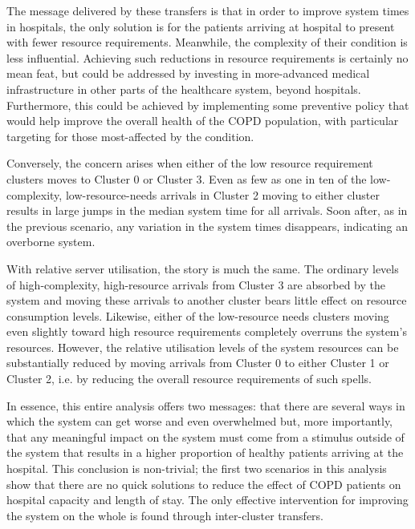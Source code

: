\begin{table}
    \centering%
    \resizebox{\textwidth}{!}{%
        
    }
    \caption{%
        Proportional changes in median relative utilisation for selected cluster
        transfers
    }\label{tab:moving_util}
\end{table}

The message delivered by these transfers is that in order to improve system
times in hospitals, the only solution is for the patients arriving at hospital
to present with fewer resource requirements. Meanwhile, the complexity of their
condition is less influential. Achieving such reductions in resource
requirements is certainly no mean feat, but could be addressed by investing in
more-advanced medical infrastructure in other parts of the healthcare system,
beyond hospitals. Furthermore, this could be achieved by implementing some
preventive policy that would help improve the overall health of the COPD
population, with particular targeting for those most-affected by the condition.

Conversely, the concern arises when either of the low resource requirement
clusters moves to Cluster 0 or Cluster 3. Even as few as one in ten of the
low-complexity, low-resource-needs arrivals in Cluster 2 moving to either
cluster results in large jumps in the median system time for all arrivals. Soon
after, as in the previous scenario, any variation in the system times
disappears, indicating an overborne system.

With relative server utilisation, the story is much the same. The ordinary
levels of high-complexity, high-resource arrivals from Cluster 3 are absorbed by
the system and moving these arrivals to another cluster bears little effect on
resource consumption levels. Likewise, either of the low-resource needs clusters
moving even slightly toward high resource requirements completely overruns the
system’s resources. However, the relative utilisation levels of the system
resources can be substantially reduced by moving arrivals from Cluster 0 to
either Cluster 1 or Cluster 2, i.e. by reducing the overall resource
requirements of such spells.

In essence, this entire analysis offers two messages: that there are several
ways in which the system can get worse and even overwhelmed but, more
importantly, that any meaningful impact on the system must come from a stimulus
outside of the system that results in a higher proportion of healthy patients
arriving at the hospital. This conclusion is non-trivial; the first two
scenarios in this analysis show that there are no quick solutions to reduce the
effect of COPD patients on hospital capacity and length of stay. The only
effective intervention for improving the system on the whole is found through
inter-cluster transfers.


